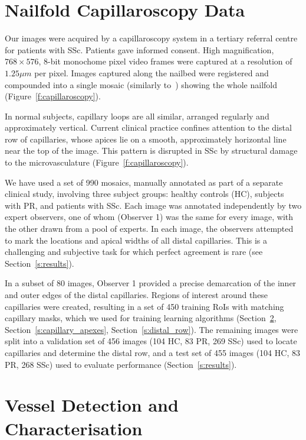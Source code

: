 \documentclass[runningheads,a4paper]{llncs}
\newcommand{\fref}[1]{Figure~\ref{#1}}
\newcommand{\sref}[1]{Section~\ref{#1}}
\begin{document}
\section{Nailfold Capillaroscopy Data}
\label{s:data}
Our images were acquired by a capillaroscopy system in a tertiary referral centre for patients with SSc. Patients gave informed consent. High magnification, $768 \times 576$, 8-bit monochome pixel video frames were captured at a resolution of $1.25 \mu m$ per pixel. Images captured along the nailbed were registered and compounded into a single mosaic (similarly to~\cite{Anderson_etal_JRh05}) showing the whole nailfold (\fref{f:capillaroscopy}).

In normal subjects, capillary loops are all similar, arranged regularly and approximately vertical. Current clinical practice confines attention to the distal row of capillaries, whose apices lie on a smooth, approximately horizontal line near the top of the image. This pattern is disrupted in SSc by structural damage to the microvasculature (\fref{f:capillaroscopy}).

We have used a set of 990 mosaics, manually annotated as part of a separate clinical study, involving three subject groups: healthy controls (HC), subjects with PR, and patients with SSc. Each image was annotated independently by two expert observers, one of whom (Observer 1) was the same for every image, with the other drawn from a pool of experts. In each image, the observers attempted to mark the locations and apical widths of all distal capillaries. This is a challenging and subjective task for which perfect agreement is rare (see \sref{s:results}).

In a subset of 80 images, Observer 1 provided a precise demarcation of the inner and outer edges of the distal capillaries. Regions of interest around these capillaries were created, resulting in a set of 450 training RoIs with matching capillary masks, which we used for training learning algorithms (\sref{s:segmenting_vessels}, \sref{s:capillary_apexes}, \sref{s:distal_row}). The remaining images were split into a validation set of 456 images (104 HC, 83 PR, 269 SSc) used to locate capillaries and determine the distal row, and a test set of 455 images (104 HC, 83 PR, 268 SSc) used to evaluate performance (\sref{s:results}).
%
\section{Vessel Detection and Characterisation}
\label{s:segmenting_vessels}
\end{document}

